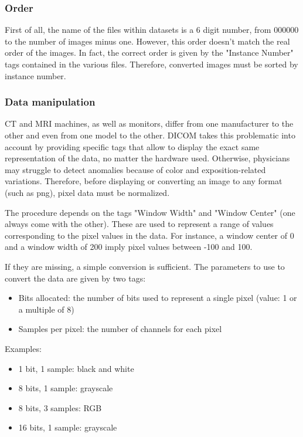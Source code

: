 \subsubsection{Order}
First of all, the name of the files within datasets is a 6 digit number, from 000000 to the number of images minus one. However, this order doesn’t match the real order of the images. In fact, the correct order is given by the "Instance Number" tags contained in the various files. Therefore, converted images must be sorted by instance number. 

\subsubsection{Data manipulation}
CT and MRI machines, as well as monitors, differ from one manufacturer to the other and even from one model to the other. DICOM takes this problematic into account by providing specific tags that allow to display the exact same representation of the data, no matter the hardware used. Otherwise, physicians may struggle to detect anomalies because of color and exposition-related variations. 
Therefore, before displaying or converting an image to any format (such as png), pixel data must be normalized. 

The procedure depends on the tags "Window Width" and "Window Center" (one always come with the other). These are used to represent a range of values corresponding to the pixel values in the data. For instance, a window center of 0 and a window width of 200 imply pixel values between -100 and 100. 

If they are missing, a simple conversion is sufficient. The parameters to use to convert the data are given by two tags: 
\begin{itemize}
	\item Bits allocated: the number of bits used to represent a single pixel (value: 1 or a multiple of 8)
	\item Samples per pixel: the number of channels for each pixel

\end{itemize}

\noindent Examples: 
\begin{itemize}
\item 1 bit, 1 sample: black and white
\item 8 bits, 1 sample: grayscale
\item 8 bits, 3 samples: RGB
\item 16 bits, 1 sample: grayscale

\end{itemize} 

